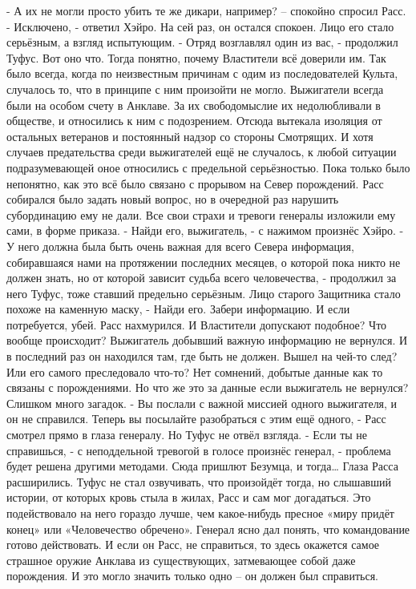\documentclass[a4paper, 12pt]{report}
\begin{document}
- А их не могли просто убить те же дикари, например? – спокойно спросил Расс. 
- Исключено, - ответил Хэйро. На сей раз, он остался спокоен. Лицо его стало серьёзным, а взгляд испытующим.
- Отряд возглавлял один из вас, - продолжил Туфус.
Вот оно что. Тогда понятно, почему Властители всё доверили им. Так было всегда, когда по неизвестным причинам с одим из последователей Культа, случалось то, что в принципе с ним произойти не могло. Выжигатели всегда были на особом счету в Анклаве. За их свободомыслие их недолюбливали в обществе, и относились к ним с подозрением. Отсюда вытекала изоляция от остальных ветеранов и постоянный надзор со стороны Смотрящих. И хотя случаев предательства среди выжигателей ещё не случалось, к любой ситуации подразумевающей оное относились с предельной серьёзностью.
	Пока только было непонятно, как это всё было связано с прорывом на Север порождений. Расс собирался было задать новый вопрос, но в очередной раз нарушить субординацию ему не дали. Все свои страхи и тревоги генералы изложили ему сами, в форме приказа.
 - Найди его, выжигатель, - с нажимом произнёс Хэйро. 
- У него должна была быть очень важная для всего Севера информация, собиравшаяся нами на протяжении последних месяцев, о которой пока никто не должен знать, но от которой зависит судьба всего человечества, - продолжил за него Туфус, тоже ставший предельно серьёзным. Лицо старого Защитника стало похоже на каменную маску, - Найди его. Забери информацию. И если потребуется, убей.
Расс нахмурился. И Властители допускают подобное? Что вообще происходит? Выжигатель добывший важную информацию не вернулся. И в последний раз он находился там, где быть не должен. Вышел на чей-то след? Или его самого преследовало что-то? Нет сомнений, добытые данные как то связаны с порождениями. Но что же это за данные если выжигатель не вернулся?
Слишком много загадок.
- Вы послали с важной миссией одного выжигателя, и он не справился. Теперь вы посылайте разобраться с этим ещё одного, - Расс смотрел прямо в глаза генералу. Но Туфус не отвёл взгляда.
- Если ты не справишься, - с неподдельной тревогой в голосе произнёс генерал, - проблема будет решена другими методами. Сюда пришлют Безумца, и тогда…
Глаза Расса расширились. Туфус не стал озвучивать, что произойдёт тогда, но слышавший истории, от которых кровь стыла в жилах, Расс и сам мог догадаться. Это подействовало на него гораздо лучше, чем какое-нибудь пресное «миру придёт конец» или «Человечество обречено». Генерал ясно дал понять, что командование готово действовать. И если он Расс, не справиться, то здесь окажется самое страшное оружие Анклава из существующих, затмевающее собой даже порождения. И это могло значить только одно – он должен был справиться.
\end{document}
